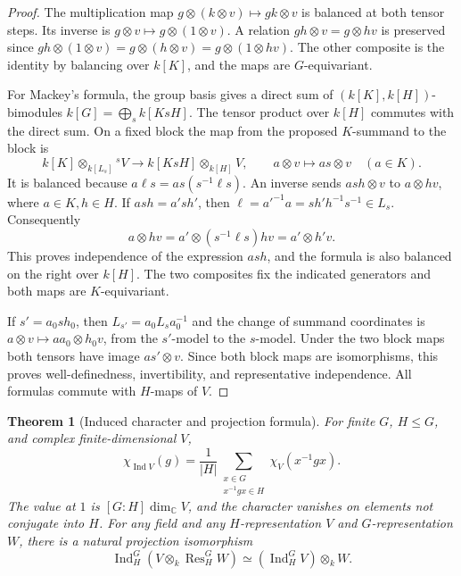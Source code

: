 \documentclass[11pt,oneside,openany]{book}
\newtheorem{theorem}{Theorem}[chapter]
\theoremstyle{definition}
\theoremstyle{remark}
\begin{document}
\begin{proof}
The multiplication map
\(g\otimes(k\otimes v)\mapsto gk\otimes v\) is balanced at both
tensor steps. Its inverse is \(g\otimes v\mapsto g\otimes(1\otimes v)\).
A relation \(gh\otimes v=g\otimes hv\) is preserved since
\(gh\otimes(1\otimes v)=g\otimes(h\otimes v)
=g\otimes(1\otimes hv)\). The other composite is the identity by
balancing over \(k[K]\), and the maps are \(G\)-equivariant.

For Mackey's formula, the group basis gives a direct sum of
\((k[K],k[H])\)-bimodules \(k[G]=\bigoplus_s k[KsH]\).
The tensor product over \(k[H]\) commutes with the direct sum.
On a fixed block the map from the proposed \(K\)-summand to
the block is
\[
 k[K]\otimes_{k[L_s]}{}^s V \longrightarrow
 k[KsH]\otimes_{k[H]}V,\qquad
 a\otimes v\longmapsto as\otimes v\quad(a\in K).
\]
It is balanced because \(a\ell s=as(s^{-1}\ell s)\). An inverse
sends \(as h\otimes v\) to \(a\otimes hv\), where \(a\in K,h\in H\).
If \(as h=a's h'\), then
\(\ell=a'^{-1}a=s h'h^{-1}s^{-1}\in L_s\). Consequently
\[
 a\otimes hv
   =a'\otimes(s^{-1}\ell s)hv=a'\otimes h'v .
\]
This proves independence of the expression \(as h\), and
the formula is also balanced on the right over \(k[H]\).
The two composites fix the indicated generators and both maps
are \(K\)-equivariant.

If \(s'=a_0s h_0\), then \(L_{s'}=a_0L_sa_0^{-1}\) and
the change of summand coordinates is
\(a\otimes v\mapsto aa_0\otimes h_0v\), from the \(s'\)-model to
the \(s\)-model. Under the two block maps both tensors have
image \(as'\otimes v\). Since both block maps are isomorphisms,
this proves well-definedness, invertibility, and representative
independence. All formulas commute with \(H\)-maps of \(V\).
\end{proof}

\begin{theorem}[Induced character and projection formula]
\label{p103:ALG-07-C03-S02}
For finite \(G\), \(H\le G\), and complex finite-dimensional \(V\),
\[
 \chi_{\operatorname{Ind}V}(g)=
 \frac1{|H|}
   \sum_{\substack{x\in G\\x^{-1}gx\in H}}\chi_V(x^{-1}gx).
\]
The value at \(1\) is \([G:H]\dim_{\mathbb C}V\), and the character
vanishes on elements not conjugate into \(H\).
For any field and any \(H\)-representation \(V\) and
\(G\)-representation \(W\), there is a natural projection isomorphism
\[
 \operatorname{Ind}_H^G(V\otimes_k\operatorname{Res}_H^G W)
      \simeq (\operatorname{Ind}_H^G V)\otimes_k W.
\]
\end{theorem}
\end{document}
